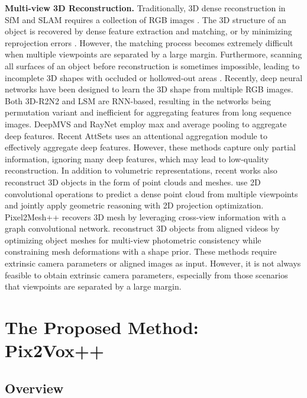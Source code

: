 \documentclass[twocolumn]{svjour3}
\begin{document}
\noindent \textbf{Multi-view 3D Reconstruction.}
Traditionally, 3D dense reconstruction in SfM and SLAM requires a collection of RGB images \citep{DBLP:books/daglib/0015576}.
The 3D structure of an object is recovered by dense feature extraction and matching, or by minimizing reprojection errors \citep{DBLP:journals/trob/CadenaCCLSN0L16}.
However, the matching process becomes extremely difficult when multiple viewpoints are separated by a large margin.
Furthermore, scanning all surfaces of an object before reconstruction is sometimes impossible, leading to incomplete 3D shapes with occluded or hollowed-out areas \citep{DBLP:journals/pami/YangRMTW19}.
Recently, deep neural networks have been designed to learn the 3D shape from multiple RGB images.
Both 3D-R2N2 \citep{DBLP:conf/eccv/ChoyXGCS16} and LSM \citep{DBLP:conf/nips/KarHM17} are RNN-based, resulting in the networks being permutation variant and inefficient for aggregating features from long sequence images.
DeepMVS \citep{DBLP:conf/cvpr/HuangMKAH18} and RayNet \citep{DBLP:conf/cvpr/PaschalidouUSGG18} employ max and average pooling to aggregate deep features.
Recent AttSets \citep{DBLP:journals/ijcv/YangSAN19} uses an attentional aggregation module to effectively aggregate deep features.
However, these methods capture only partial information, ignoring many deep features, which may lead to low-quality reconstruction.
In addition to volumetric representations, recent works also reconstruct  3D objects in the form of point clouds and meshes.
\cite{DBLP:conf/aaai/LinKL18} use 2D convolutional operations to predict a dense point cloud from multiple viewpoints and jointly apply geometric reasoning with 2D projection optimization.
Pixel2Mesh++ \citep{DBLP:conf/iccv/WenZLF19} recovers 3D mesh by leveraging cross-view information with a graph convolutional network.
\cite{DBLP:conf/cvpr/LinWRSKFL19} reconstruct 3D objects from aligned videos by optimizing object meshes for multi-view photometric consistency while constraining mesh deformations with a shape prior.
These methods require extrinsic camera parameters or aligned images as input.
However, it is not always feasible to obtain extrinsic camera parameters, especially from those scenarios that viewpoints are separated by a large margin.

\section{The Proposed Method: Pix2Vox++}

\subsection{Overview}
\end{document}

